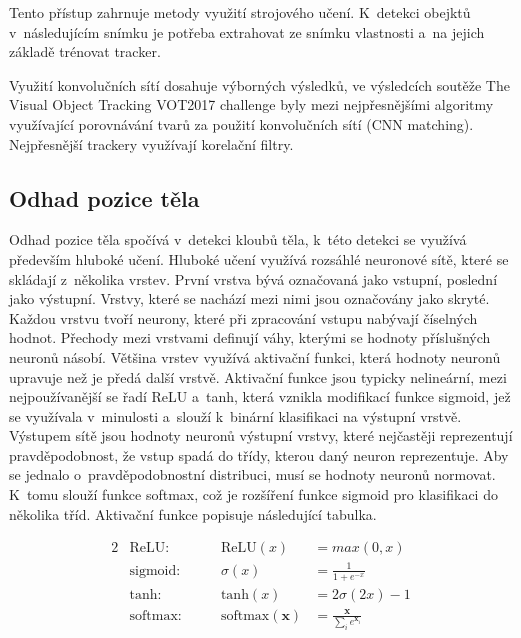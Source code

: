 Tento přístup zahrnuje metody využití strojového učení. K~detekci obejktů v~následujícím snímku je potřeba extrahovat ze snímku vlastnosti a~na jejich základě trénovat tracker.

Využití konvolučních sítí dosahuje výborných výsledků, ve výsledcích soutěže The Visual Object Tracking VOT2017 challenge \citep{VOT2017} byly mezi nejpřesnějšími algoritmy využívající porovnávání tvarů za použití konvolučních sítí (CNN matching). Nejpřesnější trackery využívají korelační filtry.



\subsection{Odhad pozice těla}

Odhad pozice těla spočívá v~detekci kloubů těla, k~této detekci se využívá především hluboké učení. Hluboké učení využívá rozsáhlé neuronové sítě, které se skládají z~několika vrstev. První vrstva bývá označovaná jako vstupní, poslední jako výstupní. Vrstvy, které se nachází mezi nimi jsou označovány jako skryté. Každou vrstvu tvoří neurony, které při zpracování vstupu nabývají číselných hodnot. Přechody mezi vrstvami definují váhy, kterými se hodnoty příslušných neuronů násobí. Většina vrstev využívá aktivační funkci, která hodnoty neuronů upravuje než je předá další vrstvě. Aktivační funkce jsou typicky nelineární, mezi nejpoužívanější se řadí ReLU a~tanh, která vznikla modifikací funkce sigmoid, jež se využívala v~minulosti a~slouží k~binární klasifikaci na výstupní vrstvě. Výstupem sítě jsou hodnoty neuronů výstupní vrstvy, které nejčastěji reprezentují pravděpodobnost, že vstup spadá do třídy, kterou daný neuron reprezentuje. Aby se jednalo o~pravděpodobnostní distribuci, musí se hodnoty neuronů normovat. K~tomu slouží funkce softmax, což je rozšíření funkce sigmoid pro klasifikaci do několika tříd. Aktivační funkce popisuje následující tabulka.

\begin{alignat*}{2}
\label{eq:aktivace}
    &\text{ReLU:} \qquad &\text{ReLU}(x) &= max(0,x) \\
    &\text{sigmoid:} \qquad &\sigma(x) &= \frac{1}{1+e^{-x}} \\
    &\text{tanh:} \qquad &\text{tanh}(x) &= 2\sigma(2x) - 1 \\
    &\text{softmax:} \qquad &\text{softmax}(\mathbf{x}) &= \frac{\mathbf{x}}{\sum_i{e^{\mathbf{x}_i}}} \\
\end{alignat*}

